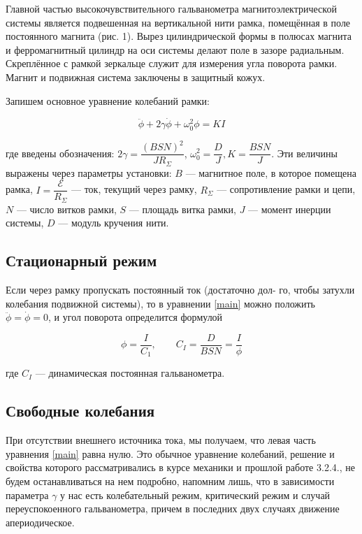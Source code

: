 \documentclass[12pt]{kiarticle} %
\newcommand{\eds}{\ensuremath{ \mathscr{E}}}
\begin{document}
Главной частью высокочувствительного гальванометра магнитоэлектрической системы является подвешенная на вертикальной нити рамка, помещённая в поле постоянного магнита (рис. 1). Вырез цилиндрической формы в полюсах магнита и ферромагнитный цилиндр на оси системы делают поле в зазоре радиальным. Скреплённое с рамкой зеркальце служит для измерения угла поворота рамки. Магнит и подвижная система заключены в защитный кожух.

Запишем основное уравнение колебаний рамки:

\begin{equation}\label{main}
\ddot{\phi} + 2\gamma\dot{\phi }+ \omega_0^2\phi = K I
\end{equation}
	
	где введены обозначения: $ 2\gamma = \dfrac{(BSN)^2}{JR_\Sigma} $, $ \omega_0^2 = \dfrac{D}{J}, K = \dfrac{BSN}{J} $. Эти величины выражены через параметры установки: $ B $ --- магнитное поле, в которое помещена рамка, $ I  = \dfrac{\eds}{R_\Sigma}$ --- ток, текущий через рамку, $ R_\Sigma $ --- сопротивление рамки и цепи, $ N $ --- число витков рамки, $ S $ --- площадь витка рамки, $ J $ --- момент инерции системы, $ D $ --- модуль кручения нити.
	
	\subsection{Стационарный режим}
	Если через рамку пропускать постоянный ток (достаточно дол-
	го, чтобы затухли колебания подвижной системы), то в уравнении \eqref{main} можно положить $ \ddot{\phi} = \dot{\phi } = 0 $, и угол поворота определится формулой
	
	\begin{equation}\label{C1}
	\phi = \dfrac{I}{C_1}, \qquad C_I = \dfrac{D}{BSN} = \dfrac{I}{\phi}
	\end{equation}
	
	где $ C_I $ --- динамическая постоянная гальванометра.
	
	\subsection{Свободные колебания}
	
	При отсутствии внешнего источника тока, мы получаем, что левая часть уравнения \eqref{main} равна нулю. Это обычное уравнение колебаний, решение и свойства которого рассматривались в курсе механики и прошлой работе 3.2.4., не будем останавливаться на нем подробно, напомним лишь, что в зависимости параметра $ \gamma $ у нас есть колебательный режим, критический режим и случай переуспокоенного гальванометра, причем в последних двух случаях движение апериодическое. 
	
\end{document}
